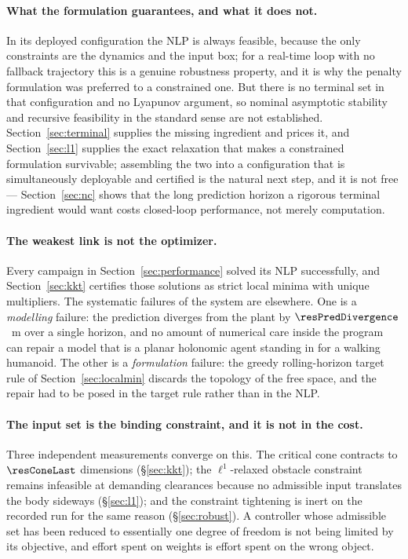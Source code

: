 \documentclass[11pt,a4paper]{article}
\begin{document}
\paragraph{What the formulation guarantees, and what it does not.} In its deployed configuration the NLP is
always feasible, because the only constraints are the dynamics and the input box; for a real-time loop with
no fallback trajectory this is a genuine robustness property, and it is why the penalty formulation was
preferred to a constrained one. But there is no terminal set in that configuration and no Lyapunov argument,
so nominal asymptotic stability and recursive feasibility in the standard sense
\cite{mayne2000constrained} are not established. Section~\ref{sec:terminal} supplies the missing ingredient
and prices it, and Section~\ref{sec:l1} supplies the exact relaxation that makes a constrained formulation
survivable; assembling the two into a configuration that is simultaneously deployable and certified is the
natural next step, and it is not free --- Section~\ref{sec:nc} shows that the long prediction horizon a
rigorous terminal ingredient would want costs closed-loop performance, not merely computation.

\paragraph{The weakest link is not the optimizer.} Every campaign in Section~\ref{sec:performance} solved its
NLP successfully, and Section~\ref{sec:kkt} certifies those solutions as strict local minima with unique
multipliers. The systematic failures of the system are elsewhere. One is a \emph{modelling} failure: the
prediction diverges from the plant by $\resPredDivergence$~m over a single horizon, and no amount of
numerical care inside the program can repair a model that is a planar holonomic agent standing in for a
walking humanoid. The other is a \emph{formulation} failure: the greedy rolling-horizon target rule of
Section~\ref{sec:localmin} discards the topology of the free space, and the repair had to be posed in the
target rule rather than in the NLP.

\paragraph{The input set is the binding constraint, and it is not in the cost.} Three independent
measurements converge on this. The critical cone contracts to $\resConeLast$ dimensions
(\S\ref{sec:kkt}); the $\ell^1$-relaxed obstacle constraint remains infeasible at demanding clearances
because no admissible input translates the body sideways (\S\ref{sec:l1}); and the constraint tightening is
inert on the recorded run for the same reason (\S\ref{sec:robust}). A controller whose admissible set has
been reduced to essentially one degree of freedom is not being limited by its objective, and effort spent on
weights is effort spent on the wrong object.
\end{document}
